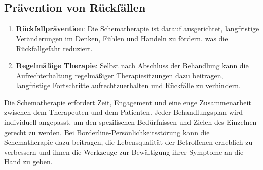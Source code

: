 \subsection{Prävention von Rückfällen}

\begin{enumerate}
\item \textbf{Rückfallprävention}: Die Schematherapie ist darauf ausgerichtet, langfristige Veränderungen im Denken, Fühlen und Handeln zu fördern, was die Rückfallgefahr reduziert.

\item \textbf{Regelmäßige Therapie}: Selbst nach Abschluss der Behandlung kann die Aufrechterhaltung regelmäßiger Therapiesitzungen dazu beitragen, langfristige Fortschritte aufrechtzuerhalten und Rückfälle zu verhindern.
\end{enumerate}

Die Schematherapie erfordert Zeit, Engagement und eine enge Zusammenarbeit zwischen dem Therapeuten und dem Patienten. Jeder Behandlungsplan wird individuell angepasst, um den spezifischen Bedürfnissen und Zielen des Einzelnen gerecht zu werden. Bei Borderline-Persönlichkeitsstörung kann die Schematherapie dazu beitragen, die Lebensqualität der Betroffenen erheblich zu verbessern und ihnen die Werkzeuge zur Bewältigung ihrer Symptome an die Hand zu geben.